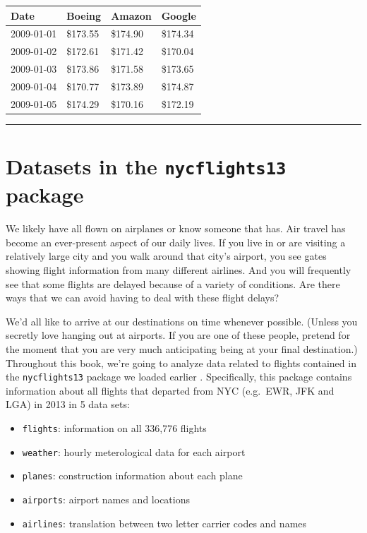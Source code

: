 \documentclass[]{tufte-book}
\let\oldrule=\rule
\renewcommand{\rule}[1]{\oldrule{\linewidth}}
\providecommand{\tightlist}{%
  \setlength{\itemsep}{0pt}\setlength{\parskip}{0pt}}
\begin{document}
\begin{tabular}{l|l|l|l}
\hline
Date & Boeing & Amazon & Google\\
\hline
2009-01-01 & \$173.55 & \$174.90 & \$174.34\\
\hline
2009-01-02 & \$172.61 & \$171.42 & \$170.04\\
\hline
2009-01-03 & \$173.86 & \$171.58 & \$173.65\\
\hline
2009-01-04 & \$170.77 & \$173.89 & \$174.87\\
\hline
2009-01-05 & \$174.29 & \$170.16 & \$172.19\\
\hline
\end{tabular}

\begin{center}\rule{0.5\linewidth}{\linethickness}\end{center}

\section{\texorpdfstring{Datasets in the \texttt{nycflights13}
package}{Datasets in the nycflights13 package}}\label{datasets-in-the-nycflights13-package}

We likely have all flown on airplanes or know someone that has. Air
travel has become an ever-present aspect of our daily lives. If you live
in or are visiting a relatively large city and you walk around that
city's airport, you see gates showing flight information from many
different airlines. And you will frequently see that some flights are
delayed because of a variety of conditions. Are there ways that we can
avoid having to deal with these flight delays?

We'd all like to arrive at our destinations on time whenever possible.
(Unless you secretly love hanging out at airports. If you are one of
these people, pretend for the moment that you are very much anticipating
being at your final destination.) Throughout this book, we're going to
analyze data related to flights contained in the \texttt{nycflights13}
package we loaded earlier \citep{R-nycflights13}. Specifically, this
package contains information about all flights that departed from NYC
(e.g.~EWR, JFK and LGA) in 2013 in 5 data sets:

\begin{itemize}
\tightlist
\item
  \texttt{flights}: information on all 336,776 flights
\item
  \texttt{weather}: hourly meterological data for each airport
\item
  \texttt{planes}: construction information about each plane
\item
  \texttt{airports}: airport names and locations
\item
  \texttt{airlines}: translation between two letter carrier codes and
  names
\end{itemize}
\end{document}
